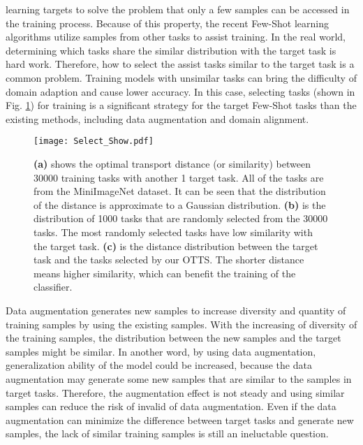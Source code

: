 \documentclass[10pt,journal,compsoc]{IEEEtran}
\begin{document}
 learning \cite{few_shot_survey,protonet,TKDE_few_shot} targets to solve the problem that only a few samples can be accessed in the training process. Because of this property, the recent Few-Shot learning algorithms utilize samples from other tasks to assist training. In the real world, determining which tasks share the similar distribution with the target task is hard work. Therefore, how to select the assist tasks similar to the target task is a common problem. Training models with unsimilar tasks can bring the difficulty of domain adaption and cause lower accuracy. In this case, selecting tasks (shown in Fig. \ref{difference}) for training is a significant strategy for the target Few-Shot tasks than the existing methods, including data augmentation and domain alignment.

\begin{figure}[t]
    \centering
    \texttt{[image: Select\_Show.pdf]}
    \caption{\textbf{(a)} shows the optimal transport distance (or similarity) between 30000 training tasks with another 1 target task. All of the tasks are from the MiniImageNet dataset. It can be seen that the distribution of the distance is approximate to a Gaussian distribution. \textbf{(b)} is the distribution of 1000 tasks that are randomly selected from the 30000 tasks. The most randomly selected tasks have low similarity with the target task. \textbf{(c)} is the distance distribution between the target task and the tasks selected by our OTTS. The shorter distance means higher similarity, which can benefit the training of the classifier.}
    \label{difference}
\end{figure}

Data augmentation \cite{Data_Augmentation,Data_Augmentation_survey} generates new samples to increase diversity and quantity of training samples by using the existing samples. With the increasing of diversity of the training samples, the distribution between the new samples and the target samples might be similar. In another word, by using data augmentation, generalization ability of the model could be increased, because the data augmentation may generate some new samples that are similar to the samples in target tasks. Therefore, the augmentation effect is not steady and using similar samples can reduce the risk of invalid of data augmentation. Even if the data augmentation can minimize the difference between target tasks and generate new samples, the lack of similar training samples is still an ineluctable question. 
\end{document}
